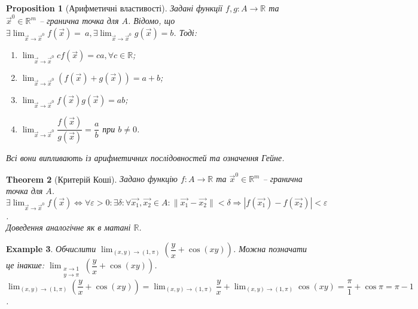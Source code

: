 \documentclass[a4paper, 10pt]{article}
\def\huge{\displaystyle}
\theoremstyle{theoremdd}
\newtheorem{theorem}{Theorem}[subsection]
\theoremstyle{theoremdd}
\theoremstyle{theoremdd}
\theoremstyle{theoremdd}
\theoremstyle{theoremdd}
\newtheorem{example}[theorem]{Example}
\theoremstyle{theoremdd}
\newtheorem{proposition}[theorem]{Proposition}
\theoremstyle{theoremdd}
\theoremstyle{theoremdd}
\theoremstyle{theoremdd}
\newcommand\Norm[1]{\|#1\|}
\begin{document}
\begin{proposition}[Арифметичні властивості]
Задані функції $f,g \colon A \to \mathbb{R}$ та $\vec{x}^0 \in \mathbb{R}^m$ -- гранична точка для $A$. Відомо, що $\exists \huge \lim_{\vec{x} \to \vec{x}^0} f(\vec{x}) = ~{a}, \exists \lim_{\vec{x} \to \vec{x}^0} g(\vec{x}) = b$. Тоді:
\begin{enumerate}[nosep,wide=0pt,label={\arabic*)}]
\item $\huge \lim_{\vec{x} \to \vec{x}^0} cf(\vec{x}) = ca, \forall c \in \mathbb{R}$;
\item $\huge \lim_{\vec{x} \to \vec{x}^0} (f(\vec{x}) + g(\vec{x})) = a + b$;
\item $\huge \lim_{\vec{x} \to \vec{x}^0} f(\vec{x})g(\vec{x}) = ab$;
\item $\huge \lim_{\vec{x} \to \vec{x}^0} \dfrac{f(\vec{x})}{g(\vec{x})} = \dfrac{a}{b}$ при $b \neq 0$.
\end{enumerate}
\textit{Всі вони випливають із арифметичних послідовностей та означення Гейне.}
\end{proposition}

\begin{theorem}[Критерій Коші]
Задано функцію $f \colon A \to \mathbb{R}$ та $\vec{x}^0 \in \mathbb{R}^m$ -- гранична точка для $A$.\\
$\exists \huge \lim_{\vec{x} \to \vec{x}^0} f(\vec{x}) \iff \forall \varepsilon > 0: \exists \delta: \forall \vec{x_1}, \vec{x_2} \in A: \Norm{\vec{x_1} - \vec{x_2}} < \delta \Rightarrow |f(\vec{x_1}) - f(\vec{x_2})| < \varepsilon$.\\
\textit{Доведення аналогічне як в матані $\mathbb{R}$.}
\end{theorem}

\begin{example}
Обчислити $\huge\lim_{(x,y) \to (1,\pi)} \left( \dfrac{y}{x} + \cos (xy) \right)$. Можна позначати це інакше: $\huge\lim_{\substack{x \to 1 \\ y \to \pi}} \left( \dfrac{y}{x} + \cos (xy) \right)$.\\
$\huge\lim_{(x,y) \to (1,\pi)} \left( \dfrac{y}{x} + \cos (xy) \right) = \lim_{(x,y) \to (1,\pi)} \dfrac{y}{x} + \lim_{(x,y) \to (1,\pi)} \cos (xy) = \dfrac{\pi}{1} + \cos \pi = \pi - 1$.
\end{example}
\end{document}
